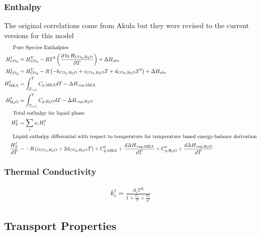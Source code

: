 \documentclass[a4paper,fleqn]{cas-sc}
\newcommand{\COtwo}{{\ce{CO2}}}
\newcommand{\HtwoO}{{\ce{H2O}}}
\newcommand{\MEA}{{\ce{MEA}}}
\newcommand{\liq}{\ell}
\begin{document}
    \subsubsection{Enthalpy}
    The original correlations come from Akula \cite{Akula2023AppendixAkula} but they were revised to the current versions for this model
    \begin{align}
        \shortintertext{\quad\; Pure Species Enthalpies}
        H^{\liq}_{\COtwo} &= H_{\text{CO}_2}^V - RT^2 \left( \frac{\partial \ln H_{\text{CO}_2, \text{H}_2\text{O}}}{\partial T} \right) + \Delta H_{abs} \\
        H^{\liq}_{\COtwo} &= H_{\text{CO}_2}^V - R \left( -b_{\text{CO}_2, \text{H}_2\text{O}} + c_{\text{CO}_2, \text{H}_2\text{O}} T + d_{\text{CO}_2, \text{H}_2\text{O}} T^2 \right) + \Delta H_{abs} \\
        H^{\liq}_{\MEA} &= \int_{T_{ref}}^{T} C_{p,\MEA} dT - \Delta H_{vap, \MEA} \\
        H^{\liq}_{\HtwoO} &= \int_{T_{ref}}^{T} C_{p,\HtwoO} dT - \Delta H_{vap, \HtwoO} \\
        \shortintertext{\quad\; Total enthalpy for liquid phase}
        H^{\liq}_{T} &= \sum_{i} x_iH^{\liq}_{i} \\
        \shortintertext{\quad\; Liquid enthalpy differential with respect to temperature for temperature based energy-balance derivation}
        \frac{H^{\liq}_{T}}{dT} &= -R\left(c_{\text{CO}_2, \text{H}_2\text{O}}  + 2d_{\text{CO}_2, \text{H}_2\text{O}} T \right) + C^{\liq}_{p, \MEA} + \frac{d\Delta H_{vap, \MEA}}{dT} +  C^{\liq}_{p, \HtwoO}+ \frac{d\Delta H_{vap, \HtwoO}}{dT}
    \end{align}

    \subsubsection{Thermal Conductivity}
    \begin{align}
        k^{t}_{i} = \frac{A_i T^{B_i}}{1 + \frac{C_i}{T} + \frac{D_i}{T^2}}
    \end{align}

    \newpage
    \subsection{Transport Properties}
\end{document}
